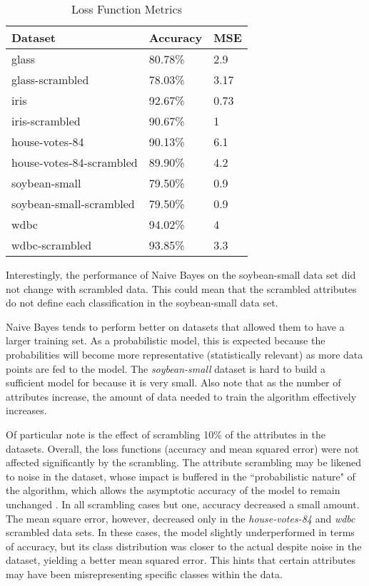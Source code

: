 \documentclass[twoside,11pt]{article}
\begin{document}
\begin{table}[h]
	\centering
	\caption{Loss Function Metrics} \label{tab:metrics}
	\begin{tabular}{|l|l|l|}
		\hline
		Dataset                  & Accuracy & MSE  \\ \hline
		glass                    & 80.78\%  & 2.9  \\ \hline
		glass-scrambled          & 78.03\%  & 3.17 \\ \hline
		iris                     & 92.67\%  & 0.73 \\ \hline
		iris-scrambled           & 90.67\%  & 1    \\ \hline
		house-votes-84           & 90.13\%  & 6.1  \\ \hline
		house-votes-84-scrambled & 89.90\%  & 4.2  \\ \hline
		soybean-small            & 79.50\%  & 0.9  \\ \hline
		soybean-small-scrambled  & 79.50\%  & 0.9  \\ \hline
		wdbc                     & 94.02\%  & 4    \\ \hline
		wdbc-scrambled           & 93.85\%  & 3.3  \\ \hline
	\end{tabular}
\end{table}

Interestingly, the performance of Naive Bayes on the soybean-small data set did not change with scrambled data. This could mean that the scrambled attributes do not define each classification in the soybean-small data set.

Naive Bayes tends to perform better on datasets that allowed them to have a larger training set. As a probabilistic model, this is expected because the probabilities will become more representative (statistically relevant) as more data points are fed to the model.
The \emph{soybean-small} dataset is hard to build a sufficient model for because it is very small.
Also note that as the number of attributes increase, the amount of data needed to train the algorithm effectively increases.

Of particular note is the effect of scrambling 10\% of the attributes in the datasets. Overall, the loss functions (accuracy and mean squared error) were not affected significantly by the scrambling.
The attribute scrambling may be likened to noise in the dataset, whose impact is buffered in the ``probabilistic nature" of the algorithm, which allows the asymptotic accuracy of the model to remain unchanged \citep{nbPaper}.
In all scrambling cases but one, accuracy decreased a small amount. The mean square error, however, decreased only in the \emph{house-votes-84} and \emph{wdbc} scrambled data sets. In these cases, the model slightly underperformed in terms of accuracy, but its class distribution was closer to the actual despite noise in the dataset, yielding a better mean squared error.
This hints that certain attributes may have been misrepresenting specific classes within the data.
\end{document}
